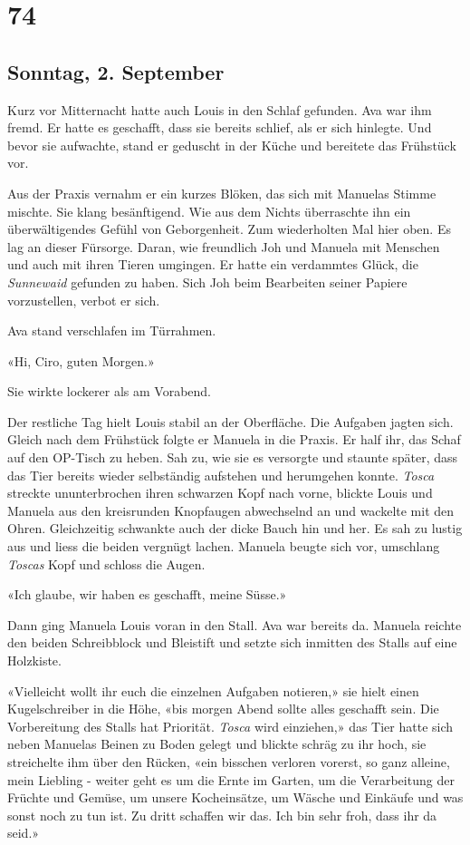 \chapter{74}

\section{Sonntag, 2. September}



Kurz vor Mitternacht hatte auch Louis in den Schlaf gefunden. Ava war
ihm fremd. Er hatte es geschafft, dass sie bereits schlief, als er sich
hinlegte. Und bevor sie aufwachte, stand er geduscht in der Küche und
bereitete das Frühstück vor.

Aus der Praxis vernahm er ein kurzes Blöken, das sich mit Manuelas
Stimme mischte. Sie klang besänftigend. Wie aus dem Nichts überraschte ihn ein überwältigendes Gefühl von Geborgenheit. Zum wiederholten Mal hier oben. Es lag an dieser Fürsorge. Daran, wie freundlich Joh und Manuela mit Menschen und auch mit ihren Tieren umgingen. Er hatte ein verdammtes Glück, die \emph{Sunnewaid} gefunden zu haben. Sich Joh beim Bearbeiten seiner Papiere vorzustellen, verbot er sich.

Ava stand verschlafen im Türrahmen. 

«Hi, Ciro, guten Morgen.»

Sie wirkte lockerer als am Vorabend. 

\sectionbreak

Der restliche Tag hielt Louis stabil an der Oberfläche. Die Aufgaben
jagten sich. Gleich nach dem Frühstück folgte er Manuela in die Praxis.
Er half ihr, das Schaf auf den OP-Tisch zu heben. Sah zu, wie sie es
versorgte und staunte später, dass das Tier bereits wieder selbständig
aufstehen und herumgehen konnte. \emph{Tosca} streckte ununterbrochen
ihren schwarzen Kopf nach vorne, blickte Louis und Manuela aus den 
kreisrunden Knopfaugen abwechselnd an und wackelte mit den Ohren. Gleichzeitig
schwankte auch der dicke Bauch hin und her. Es sah zu lustig aus und
liess die beiden vergnügt lachen. Manuela beugte sich vor, umschlang
\emph{Toscas} Kopf und schloss die Augen.

«Ich glaube, wir haben es geschafft, meine Süsse.»

Dann ging Manuela Louis voran in den Stall. Ava war bereits da. 
Manuela reichte den beiden Schreibblock und Bleistift und setzte sich
inmitten des Stalls auf eine Holzkiste.

«Vielleicht wollt ihr euch die einzelnen Aufgaben notieren,» sie hielt einen Kugelschreiber  
in die Höhe, «bis morgen Abend sollte alles geschafft sein. Die Vorbereitung des Stalls hat Priorität. 
\emph{Tosca} wird einziehen,» das Tier hatte sich neben Manuelas Beinen zu Boden gelegt und blickte
schräg zu ihr hoch, sie streichelte ihm über den Rücken, «ein bisschen verloren vorerst, so ganz alleine, mein Liebling - weiter geht es um die Ernte im Garten, um die Verarbeitung der Früchte und Gemüse, um unsere Kocheinsätze, um Wäsche und Einkäufe und was sonst noch zu tun ist. Zu dritt schaffen wir das. Ich bin sehr froh, dass ihr da seid.»

